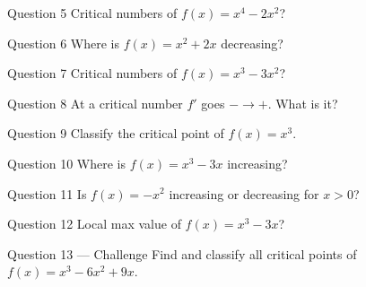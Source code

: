 \documentclass[11pt]{article}
\begin{document}
\begin{qbox}{Question 5}
Critical numbers of $f(x)=x^4-2x^2$?\workspace{2.4cm}
\end{qbox}

\begin{qbox}{Question 6}
Where is $f(x)=x^2+2x$ decreasing?\workspace{2.4cm}
\end{qbox}

\begin{qbox}{Question 7}
Critical numbers of $f(x)=x^3-3x^2$?\workspace{2.4cm}
\end{qbox}

\begin{qbox}{Question 8}
At a critical number $f'$ goes $-\to+$. What is it?\workspace{2.4cm}
\end{qbox}

\begin{qbox}{Question 9}
Classify the critical point of $f(x)=x^3$.\workspace{2.4cm}
\end{qbox}

\begin{qbox}{Question 10}
Where is $f(x)=x^3-3x$ increasing?\workspace{2.4cm}
\end{qbox}

\begin{qbox}{Question 11}
Is $f(x)=-x^2$ increasing or decreasing for $x>0$?\workspace{2.4cm}
\end{qbox}

\begin{qbox}{Question 12}
Local max value of $f(x)=x^3-3x$?\workspace{2.4cm}
\end{qbox}

\begin{qbox}{Question 13 --- Challenge}
Find and classify all critical points of $f(x)=x^3-6x^2+9x$.\workspace{3.5cm}
\end{qbox}

\clearpage
{}
\end{document}
